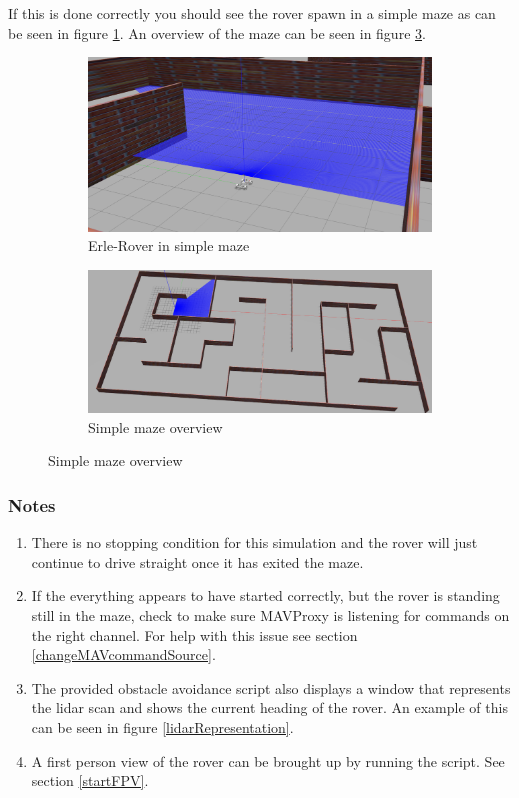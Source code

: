 \documentclass{report}
\begin{document}
If this is done correctly you should see the rover spawn in a simple maze as can be seen in figure \ref{rovermaze1}. An overview of the maze can be seen in figure \ref{rovermaze2}.

\begin{figure}[ht]
	\centering
	\begin{subfigure}{.5\textwidth}
		\centering
		\includegraphics[width=0.9\linewidth]{Images/rover_maze_1}
		\caption{Erle-Rover in simple maze}
		\label{rovermaze1}
	\end{subfigure}%
	\begin{subfigure}{.5\textwidth}
		\centering
		\includegraphics[width=1.05\linewidth]{Images/rover_maze_2}
		\caption{Simple maze overview}
		\label{rovermaze2}
	\end{subfigure}
\end{figure}

\subsubsection{Notes}
\begin{enumerate}
	\item There is no stopping condition for this simulation and the rover will just continue to drive straight once it has exited the maze.
	
	\item If the everything appears to have started correctly, but the rover is standing still in the maze, check to make sure MAVProxy is listening for commands on the right channel. For help with this issue see section \ref{changeMAVcommandSource}.
	
	\item The provided obstacle avoidance script also displays a window that represents the lidar scan and shows the current heading of the rover. An example of this can be seen in figure \ref{lidarRepresentation}.
	
	\item A first person view of the rover can be brought up by running the script. See section \ref{startFPV}.
\end{enumerate}
\end{document}
